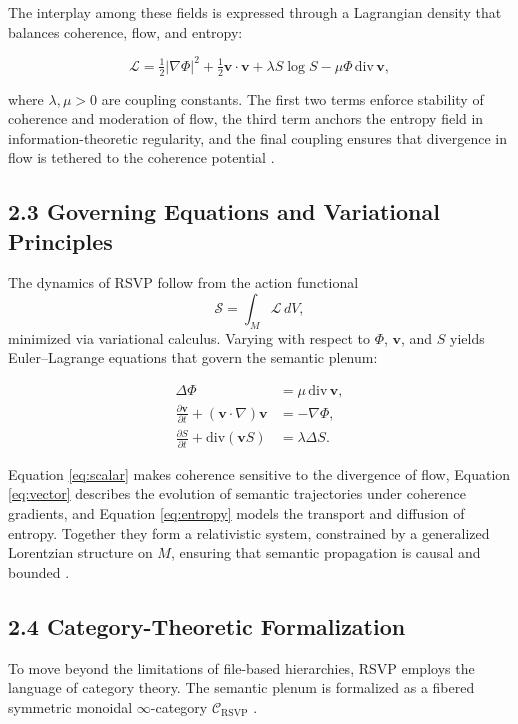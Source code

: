 \documentclass[12pt]{article}
\begin{document}
The interplay among these fields is expressed through a Lagrangian density that 
balances coherence, flow, and entropy:

\[
\mathcal{L} = \tfrac{1}{2} |\nabla \Phi|^2 
+ \tfrac{1}{2} \mathbf{v} \cdot \mathbf{v} 
+ \lambda S \log S 
- \mu \Phi \, \mathrm{div} \,\mathbf{v},
\]

where \(\lambda, \mu > 0\) are coupling constants. The first two terms enforce stability 
of coherence and moderation of flow, the third term anchors the entropy field in 
information-theoretic regularity, and the final coupling ensures that divergence in 
flow is tethered to the coherence potential \citep{atiyah1969, jaynes2003}.

\subsection*{2.3 Governing Equations and Variational Principles}

The dynamics of RSVP follow from the action functional
\[
\mathcal{S} = \int_{M} \mathcal{L} \, dV,
\]
minimized via variational calculus. Varying with respect to \(\Phi\), \(\mathbf{v}\), and \(S\) 
yields Euler–Lagrange equations that govern the semantic plenum:

\begin{align}
\Delta \Phi &= \mu \,\mathrm{div}\,\mathbf{v}, \label{eq:scalar} \\
\frac{\partial \mathbf{v}}{\partial t} + (\mathbf{v} \cdot \nabla)\mathbf{v} &= -\nabla \Phi, \label{eq:vector} \\
\frac{\partial S}{\partial t} + \mathrm{div}(\mathbf{v}S) &= \lambda \Delta S. \label{eq:entropy}
\end{align}

Equation \eqref{eq:scalar} makes coherence sensitive to the divergence of flow, 
Equation \eqref{eq:vector} describes the evolution of semantic trajectories under 
coherence gradients, and Equation \eqref{eq:entropy} models the transport and diffusion 
of entropy. Together they form a relativistic system, constrained by a generalized 
Lorentzian structure on \(M\), ensuring that semantic propagation is causal and bounded 
\citep{baez2011}.

\subsection*{2.4 Category-Theoretic Formalization}

To move beyond the limitations of file-based hierarchies, RSVP employs the language 
of category theory. The semantic plenum is formalized as a fibered symmetric monoidal 
\(\infty\)-category \(\mathcal{C}_{\text{RSVP}}\) \citep{maclane1998, lawvere2009}. 
\end{document}
